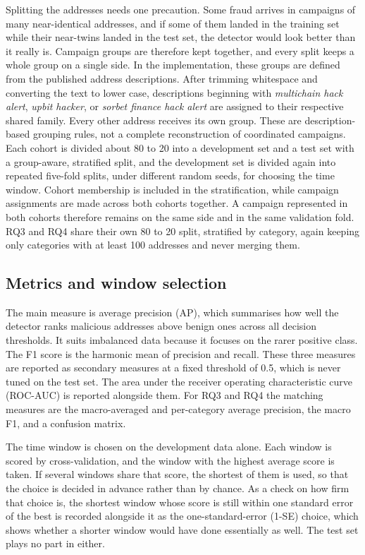 Splitting the addresses needs one precaution. Some fraud arrives in campaigns of
many near-identical addresses, and if some of them landed in the training set
while their near-twins landed in the test set, the detector would look better than
it really is. Campaign groups are therefore kept together, and every split keeps
a whole group on a single side. In the implementation, these groups are defined
from the published address descriptions. After trimming whitespace and converting
the text to lower case, descriptions beginning with
\emph{multichain hack alert}, \emph{upbit hacker}, or
\emph{sorbet finance hack alert} are assigned to their respective shared
family. Every other address receives its own group. These are description-based
grouping rules, not a complete reconstruction of coordinated campaigns.
Each cohort is divided about
80 to 20 into a development set and a test set with a group-aware, stratified
split, and the development set is divided again into repeated five-fold splits,
under different random seeds, for choosing the time window. Cohort membership is
included in the stratification, while campaign assignments are made across both
cohorts together. A campaign represented in both cohorts therefore remains on
the same side and in the same validation fold. RQ3 and RQ4 share their own 80 to
20 split, stratified by category, again keeping only categories with at least 100
addresses and never merging them.

\subsection{Metrics and window selection}

The main measure is average precision (AP), which summarises how well the detector
ranks malicious addresses above benign ones across all decision thresholds. It
suits imbalanced data because it focuses on the rarer positive class. The F1
score is the harmonic mean of precision and recall. These three measures are
reported as secondary measures at a fixed threshold of
0.5, which is never tuned on the test set. The area under the receiver operating
characteristic curve (ROC-AUC) is reported alongside them.
For RQ3 and RQ4 the matching measures are the macro-averaged and per-category
average precision, the macro F1, and a confusion matrix.

The time window is chosen on the development data alone. Each window is scored by
cross-validation, and the window with the highest average score is taken. If
several windows share that score, the shortest of them is used, so that the choice
is decided in advance rather than by chance. As a check on how firm that choice is,
the shortest window whose score is still within one standard error of the best is
recorded alongside it as the one-standard-error (1-SE) choice, which shows whether a shorter window would have done
essentially as well. The test set plays no part in either.

